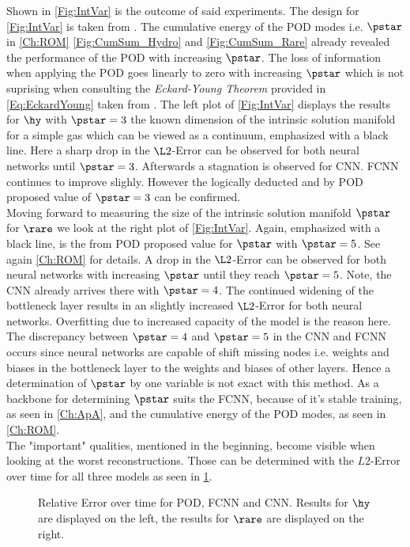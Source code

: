 Shown in \cref{Fig:IntVar} is the outcome of said experiments. The design for \cref{Fig:IntVar} is taken from \cite{Carlberg}. The cumulative energy of the POD modes i.e. $\pstar$ in \cref{Ch:ROM} \cref{Fig:CumSum_Hydro} and \cref{Fig:CumSum_Rare} already revealed the performance of the POD with increasing $\pstar$. The loss of information when applying the POD goes linearly to zero with increasing $\pstar$ which is not suprising when consulting the \textit{Eckard-Young Theorem} provided in \cref{Eq:EckardYoung} taken from \cite{Kutz}.
The left plot of \cref{Fig:IntVar} displays the results for $\hy$ with $\pstar=3$ the known dimension of the intrinsic solution manifold for a simple gas which can be viewed as a continuum, emphasized with a black line. Here a sharp drop in the $\L2$-Error can be observed for both neural networks until $\pstar = 3$. Afterwards a stagnation is observed for CNN. FCNN continues to improve slighly. However the logically deducted and by POD proposed value of $\pstar=3$ can be confirmed.\\
Moving forward to measuring the size of the intrinsic solution manifold \(\pstar\) for $\rare$ we look at the right plot of \cref{Fig:IntVar}. Again, emphasized  with a black line, is the from POD proposed value for $\pstar$ with $\pstar=5$. See again \cref{Ch:ROM} for details. A drop in the $\L2$-Error can be observed for both neural networks with increasing $\pstar$ until they reach $\pstar = 5$. Note, the CNN already arrives there with \(\pstar = 4\). The continued widening of the bottleneck layer results in an slightly increased $\L2$-Error for both neural networks. Overfitting due to increased capacity of the model is the reason here. The discrepancy between \(\pstar=4\) and \(\pstar = 5\) in the CNN and FCNN occurs since neural networks are capable of shift missing nodes i.e. weights and biases in the bottleneck layer to the weights and biases of other layers. Hence a determination of \(\pstar\) by one variable is not exact with this method. As a backbone for determining $\pstar$ suits the FCNN, because of it's stable training, as seen in \cref{Ch:ApA}, and the cumulative energy of the POD modes, as seen in \cref{Ch:ROM}.\\
The "important" qualities, mentioned in the beginning, become visible when looking at the worst reconstructions. Those can be determined with the $L2$-Error over time for all three models as seen in \cref{Fig:ErrTime}.
\begin{figure}[htpb!]
	
	\caption{Relative Error over time for POD, FCNN and CNN. Results for $\hy$ are displayed on the left, the results for $\rare$ are displayed on the right.}
	\label{Fig:ErrTime}
\end{figure}
